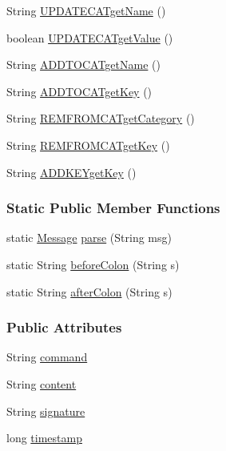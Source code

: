 \begin{DoxyCompactItemize}
\item 
String \hyperlink{classballmerpeak_1_1turtlenet_1_1shared_1_1Message_a4e1c7c11699f6a34f462b9681c77da38}{U\-P\-D\-A\-T\-E\-C\-A\-Tget\-Name} ()
\item 
boolean \hyperlink{classballmerpeak_1_1turtlenet_1_1shared_1_1Message_a3ed9388192f3e9951a35e51b6f127b00}{U\-P\-D\-A\-T\-E\-C\-A\-Tget\-Value} ()
\item 
String \hyperlink{classballmerpeak_1_1turtlenet_1_1shared_1_1Message_a1a2daa84f1872a2eae2d5546c33a77a2}{A\-D\-D\-T\-O\-C\-A\-Tget\-Name} ()
\item 
String \hyperlink{classballmerpeak_1_1turtlenet_1_1shared_1_1Message_ae23107194408d72c962fdda375d15631}{A\-D\-D\-T\-O\-C\-A\-Tget\-Key} ()
\item 
String \hyperlink{classballmerpeak_1_1turtlenet_1_1shared_1_1Message_a4246998ff358cef75ab8d500cdbf59e5}{R\-E\-M\-F\-R\-O\-M\-C\-A\-Tget\-Category} ()
\item 
String \hyperlink{classballmerpeak_1_1turtlenet_1_1shared_1_1Message_a77527087a8adfe105a8d65e0ad6d341d}{R\-E\-M\-F\-R\-O\-M\-C\-A\-Tget\-Key} ()
\item 
String \hyperlink{classballmerpeak_1_1turtlenet_1_1shared_1_1Message_ac16d91309a7a94999c7626737a86db63}{A\-D\-D\-K\-E\-Yget\-Key} ()
\end{DoxyCompactItemize}
\subsubsection*{Static Public Member Functions}
\begin{DoxyCompactItemize}
\item 
static \hyperlink{classballmerpeak_1_1turtlenet_1_1shared_1_1Message}{Message} \hyperlink{classballmerpeak_1_1turtlenet_1_1shared_1_1Message_a6f88e1021ee9943badeeffd2ecf32262}{parse} (String msg)
\item 
static String \hyperlink{classballmerpeak_1_1turtlenet_1_1shared_1_1Message_add3d57b933d713634ffc42d4757c18dd}{before\-Colon} (String s)
\item 
static String \hyperlink{classballmerpeak_1_1turtlenet_1_1shared_1_1Message_a51657a4b0fa0fe8080a6d9db779c2767}{after\-Colon} (String s)
\end{DoxyCompactItemize}
\subsubsection*{Public Attributes}
\begin{DoxyCompactItemize}
\item 
String \hyperlink{classballmerpeak_1_1turtlenet_1_1shared_1_1Message_a6057d3c8ba04010edfb343203176645d}{command}
\item 
String \hyperlink{classballmerpeak_1_1turtlenet_1_1shared_1_1Message_a88b89de79f9fec571a22623688697de9}{content}
\item 
String \hyperlink{classballmerpeak_1_1turtlenet_1_1shared_1_1Message_a71a41cba8610df3d655b4b417a0361bc}{signature}
\item 
long \hyperlink{classballmerpeak_1_1turtlenet_1_1shared_1_1Message_acc5644d2bce101cdcc576cb1b87cdf70}{timestamp}
\end{DoxyCompactItemize}


